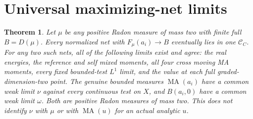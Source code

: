 \documentclass[11pt]{article}
\newtheorem{theorem}{Theorem}
\newcommand{\MA}{\operatorname{MA}}
\newcommand{\C}{\mathcal C}
\begin{document}
\section{Universal maximizing-net limits}
\begin{theorem}\label{universal}
Let $\mu$ be any positive Radon measure of mass two with finite full
$B=D(\mu)$. Every normalized net with $F_\mu(a_i)\to B$ eventually
lies in one $\C_C$. For any two such nets, all of the following limits
exist and agree: the real energies, the reference and self mixed moments,
all four cross moving MA moments, every fixed bounded-test $L^1$ limit,
and the value at each full graded-dimension-two point. The genuine bounded
measures $\MA(a_i)$ have a common weak limit $\nu$ against \emph{every}
continuous test on $X$, and $B(a_i,0)$ have a common weak limit $\omega$.
Both are positive Radon measures of mass two. This does not identify
$\nu$ with $\mu$ or with $\MA(u)$ for an actual analytic $u$.
\end{theorem}
\end{document}
